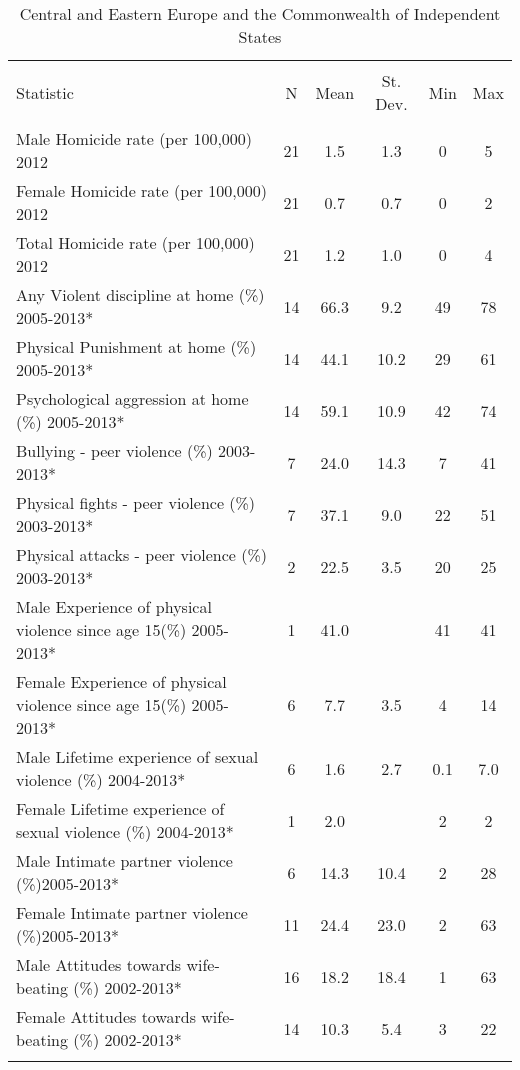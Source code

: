 
\begin{table}[!htbp] \centering 
  \caption{Central and Eastern Europe and the Commonwealth of Independent States} 
  \label{} 
\begin{tabular}{@{\extracolsep{5pt}}lccccc} 
\\[-1.8ex]\hline 
\hline \\[-1.8ex] 
Statistic & \multicolumn{1}{c}{N} & \multicolumn{1}{c}{Mean} & \multicolumn{1}{c}{St. Dev.} & \multicolumn{1}{c}{Min} & \multicolumn{1}{c}{Max} \\ 
\hline \\[-1.8ex] 
Male Homicide rate (per 100,000) 2012 & 21 & 1.5 & 1.3 & 0 & 5 \\ 
Female Homicide rate (per 100,000)  2012 & 21 & 0.7 & 0.7 & 0 & 2 \\ 
Total Homicide rate (per 100,000)  2012 & 21 & 1.2 & 1.0 & 0 & 4 \\ 
Any Violent discipline at home (\%) 2005-2013* & 14 & 66.3 & 9.2 & 49 & 78 \\ 
Physical Punishment at home (\%) 2005-2013* & 14 & 44.1 & 10.2 & 29 & 61 \\ 
Psychological aggression at home (\%) 2005-2013* & 14 & 59.1 & 10.9 & 42 & 74 \\ 
Bullying - peer violence (\%) 2003-2013* & 7 & 24.0 & 14.3 & 7 & 41 \\ 
Physical fights - peer violence (\%) 2003-2013* & 7 & 37.1 & 9.0 & 22 & 51 \\ 
Physical attacks - peer violence (\%) 2003-2013* & 2 & 22.5 & 3.5 & 20 & 25 \\ 
Male Experience of physical violence since age 15(\%) 2005-2013* & 1 & 41.0 &  & 41 & 41 \\ 
Female Experience of physical violence since age 15(\%) 2005-2013* & 6 & 7.7 & 3.5 & 4 & 14 \\ 
Male Lifetime experience of sexual violence (\%) 2004-2013* & 6 & 1.6 & 2.7 & 0.1 & 7.0 \\ 
Female Lifetime experience of sexual violence (\%) 2004-2013* & 1 & 2.0 &  & 2 & 2 \\ 
Male Intimate partner violence (\%)2005-2013* & 6 & 14.3 & 10.4 & 2 & 28 \\ 
Female Intimate partner violence (\%)2005-2013* & 11 & 24.4 & 23.0 & 2 & 63 \\ 
Male Attitudes towards wife-beating (\%) 2002-2013* & 16 & 18.2 & 18.4 & 1 & 63 \\ 
Female Attitudes towards wife-beating (\%) 2002-2013* & 14 & 10.3 & 5.4 & 3 & 22 \\ 
\hline \\[-1.8ex] 
\end{tabular} 
\end{table} 

